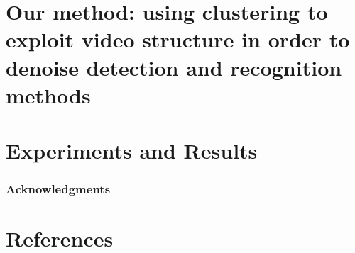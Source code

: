 \documentclass{article}
\begin{document}

\section{Our method: using clustering to exploit video structure in order to denoise detection and recognition methods}


\section{Experiments and Results}

\subsubsection*{Acknowledgments}

\section*{References}



\end{document}
